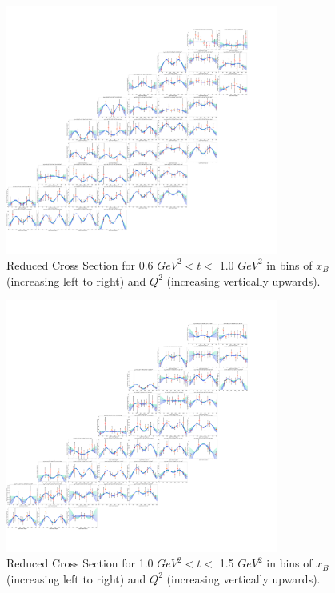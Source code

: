     \begin{figure}[ht]
        \centering
        \includegraphics[trim={14.6cm 4cm 27.2cm 4cm},clip,width=0.8\textwidth]{Chapters/Ch5-Further/c12xsec/combined_t0.6.png}
        \caption[Reduced Cross Section for 0.6 $GeV^2 < t <$ 1.0 $ GeV^2$]{Reduced Cross Section for 0.6 $ GeV^2 < t <$ 1.0 $GeV^2$ in bins of $x_B$ (increasing left to right) and $Q^2$ (increasing vertically upwards). }
        \label{fig:combined_t0.6}
    \end{figure}
    
    \begin{figure}[ht]
        \centering
        \includegraphics[trim={14.6cm 4cm 27.2cm 4cm},clip,width=0.8\textwidth]{Chapters/Ch5-Further/c12xsec/combined_t1.0.png}
        \caption[Reduced Cross Section for 1.0 $GeV^2 < t <$ 1.5 $ GeV^2$]{Reduced Cross Section for 1.0 $ GeV^2 < t <$ 1.5 $GeV^2$ in bins of $x_B$ (increasing left to right) and $Q^2$ (increasing vertically upwards). }
        \label{fig:combined_t1.0}
    \end{figure}
    
